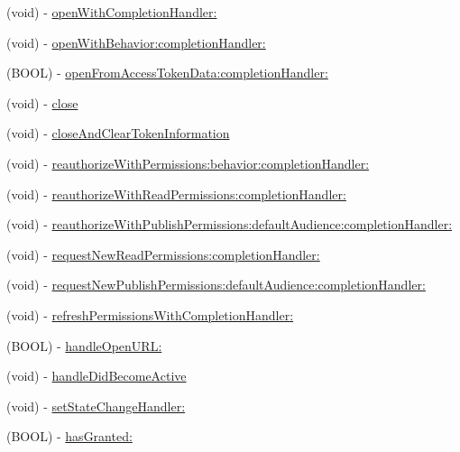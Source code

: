 \begin{DoxyCompactItemize}
\item 
(void) -\/ \hyperlink{interfaceFBSession_a874152230789c87cd181d1f976e3715f}{open\+With\+Completion\+Handler\+:}
\item 
(void) -\/ \hyperlink{interfaceFBSession_add7058f99fde92c093a92acf192dcd0a}{open\+With\+Behavior\+:completion\+Handler\+:}
\item 
(B\+O\+OL) -\/ \hyperlink{interfaceFBSession_a669e34ba5599646255507299f7a60dac}{open\+From\+Access\+Token\+Data\+:completion\+Handler\+:}
\item 
(void) -\/ \hyperlink{interfaceFBSession_a91eccb960e90fc8cc6d24df1b2e94ce3}{close}
\item 
(void) -\/ \hyperlink{interfaceFBSession_ac4ad0564da77b3cecc0c67f762f5f1c7}{close\+And\+Clear\+Token\+Information}
\item 
(void) -\/ \hyperlink{interfaceFBSession_ac78d18a8fc82c995e326f2866ca9298f}{reauthorize\+With\+Permissions\+:behavior\+:completion\+Handler\+:}
\item 
(void) -\/ \hyperlink{interfaceFBSession_a5c15996bb59afc28460f92645cf6e7f0}{reauthorize\+With\+Read\+Permissions\+:completion\+Handler\+:}
\item 
(void) -\/ \hyperlink{interfaceFBSession_af0b2652e875c4996166b1c7ce3d12b73}{reauthorize\+With\+Publish\+Permissions\+:default\+Audience\+:completion\+Handler\+:}
\item 
(void) -\/ \hyperlink{interfaceFBSession_a14cf87331489399e4317bda2c718d3a3}{request\+New\+Read\+Permissions\+:completion\+Handler\+:}
\item 
(void) -\/ \hyperlink{interfaceFBSession_a86dd849f0bd1f667e6107a13deb4607d}{request\+New\+Publish\+Permissions\+:default\+Audience\+:completion\+Handler\+:}
\item 
(void) -\/ \hyperlink{interfaceFBSession_a569f5daa686e4593bd0d5e68016a15a0}{refresh\+Permissions\+With\+Completion\+Handler\+:}
\item 
(B\+O\+OL) -\/ \hyperlink{interfaceFBSession_a99548fc3fd7dc7f5b8dc24019be88000}{handle\+Open\+U\+R\+L\+:}
\item 
(void) -\/ \hyperlink{interfaceFBSession_a647536f4770fc746b6865ad610779767}{handle\+Did\+Become\+Active}
\item 
(void) -\/ \hyperlink{interfaceFBSession_a56e9467165f832f3151dadd14190868b}{set\+State\+Change\+Handler\+:}
\item 
(B\+O\+OL) -\/ \hyperlink{interfaceFBSession_aa74d6239fcde1f9d6dd9530538eb691b}{has\+Granted\+:}
\item 

\end{DoxyCompactItemize}
